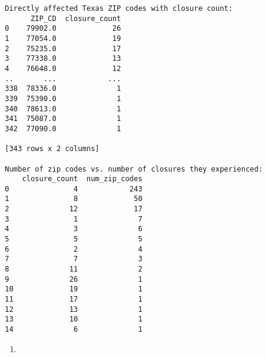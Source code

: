 \documentclass[
  letterpaper,
  DIV=11,
  numbers=noendperiod]{scrartcl}
\providecommand{\tightlist}{%
  \setlength{\itemsep}{0pt}\setlength{\parskip}{0pt}}\usepackage{longtable,booktabs,array}
\begin{document}
\begin{verbatim}
Directly affected Texas ZIP codes with closure count:
      ZIP_CD  closure_count
0    79902.0             26
1    77054.0             19
2    75235.0             17
3    77338.0             13
4    76648.0             12
..       ...            ...
338  78336.0              1
339  75390.0              1
340  78613.0              1
341  75087.0              1
342  77090.0              1

[343 rows x 2 columns]

Number of zip codes vs. number of closures they experienced:
    closure_count  num_zip_codes
0               4            243
1               8             50
2              12             17
3               1              7
4               3              6
5               5              5
6               2              4
7               7              3
8              11              2
9              26              1
10             19              1
11             17              1
12             13              1
13             10              1
14              6              1
\end{verbatim}

\begin{enumerate}
\def\labelenumi{\arabic{enumi}.}
\setcounter{enumi}{1}
\tightlist
\item
\end{enumerate}
\end{document}
